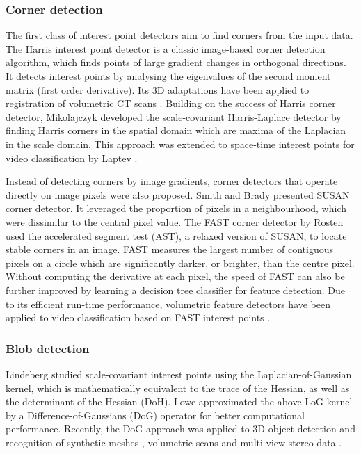 \subsubsection{Corner detection}
The first class of interest point detectors aim to find corners from the input data.
The Harris interest point detector \cite{Harris1988} is a classic image-based corner detection algorithm, which finds points of large gradient changes in orthogonal directions. It detects interest points by analysing the eigenvalues of the second moment matrix (first order derivative). Its 3D adaptations have been applied to registration of volumetric CT scans \cite{Ruiz-Alzola2001, Dalvi2010}.  
Building on the success of Harris corner detector, Mikolajczyk \cite{Mikolajczyk2004} developed the scale-covariant Harris-Laplace detector by finding Harris corners in the spatial domain which are maxima of the Laplacian in the scale domain. 
This approach was extended to space-time interest points for video classification by Laptev \cite{Laptev2005}. 

Instead of detecting corners by image gradients, corner detectors that operate directly on image pixels were also proposed. 
Smith and Brady \cite{Smith1997} presented SUSAN corner detector. It leveraged the proportion of pixels in a neighbourhood, which were dissimilar to the central pixel value.
The FAST corner detector by Rosten \etal \cite{Rosten2010} used the accelerated segment test (AST), a relaxed version of SUSAN, to locate stable corners in an image.  
FAST measures the largest number of contiguous pixels on a circle which are significantly darker, or brighter, than the centre pixel. Without computing the derivative at each pixel, the speed of FAST can also be further improved by learning a decision tree classifier for feature detection. Due to its efficient run-time performance, volumetric feature detectors have been applied to video classification based on FAST interest points \cite{Koelstra2009,Yu2010}. 

\subsubsection{Blob detection}

Lindeberg \cite{Lindeberg1998} studied scale-covariant interest points using the Laplacian-of-Gaussian kernel, which is mathematically equivalent to the trace of the Hessian, as well as the determinant of the Hessian (DoH). Lowe \cite{Lowe2004} approximated the above LoG kernel by a Difference-of-Gaussians (DoG) operator for better computational performance. Recently, the DoG approach was applied to 3D object detection and recognition of synthetic meshes \cite{Wessel2006}, volumetric scans \cite{Flitton2010} and multi-view stereo data \cite{Pham2011}.

